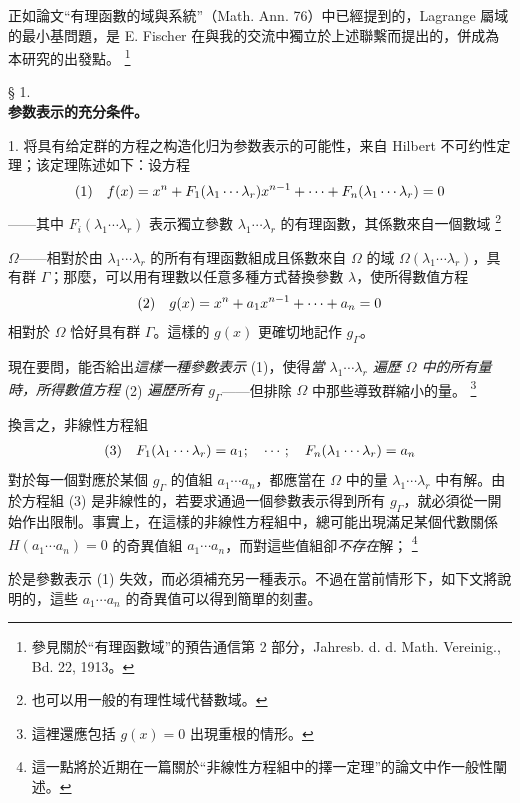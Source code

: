\documentclass[11pt]{article}
\providecommand{\glqq}{“}
\providecommand{\grqq}{”}
\providecommand{\srcfn}[2]{%
  \begingroup
  \renewcommand{\thefootnote}{#1}%
  \footnote{#2}%
  \addtocounter{footnote}{-1}%
  \endgroup}
\begin{document}
正如論文\glqq{}有理函數的域與系統\grqq{}（Math. Ann. 76）中已經提到的，Lagrange 屬域的最小基問題，是 E. Fischer 在與我的交流中獨立於上述聯繫而提出的，併成為本研究的出發點。\srcfn{**)}{參見關於\glqq{}有理函數域\grqq{}的預告通信第 2 部分，Jahresb. d. d. Math. Vereinig., Bd. 22, 1913。}

\begin{center}
§ 1.\\[0.75em]
\textbf{参数表示的充分条件。}
\end{center}

1. 将具有给定群的方程之构造化归为参数表示的可能性，来自 Hilbert 不可约性定理；该定理陈述如下：设方程
\[
\begin{array}{@{}l@{\quad}l@{}}
(1)& \displaystyle f(x)=x^n+F_1(\lambda_1\cdots\lambda_r)x^{n-1}+\cdots+F_n(\lambda_1\cdots\lambda_r)=0
\end{array}
\]
——其中 $F_i(\lambda_1\cdots\lambda_r)$ 表示獨立參數 $\lambda_1\cdots\lambda_r$ 的有理函數，其係數來自一個數域\srcfn{***)}{也可以用一般的有理性域代替數域。}$\Omega$——相對於由 $\lambda_1\cdots\lambda_r$ 的所有有理函數組成且係數來自 $\Omega$ 的域 $\Omega(\lambda_1\cdots\lambda_r)$，具有群 $\Gamma$；那麼，可以用有理數以任意多種方式替換參數 $\lambda$，使所得數值方程
\[
\begin{array}{@{}l@{\quad}l@{}}
(2)& \displaystyle g(x)=x^n+a_1x^{n-1}+\cdots+a_n=0
\end{array}
\]
相對於 $\Omega$ 恰好具有群 $\Gamma$。這樣的 $g(x)$ 更確切地記作 $g_\Gamma$。

現在要問，能否給出\emph{這樣一種參數表示} (1)，使得\emph{當 $\lambda_1\cdots\lambda_r$ 遍歷 $\Omega$ 中的所有量時，所得數值方程} (2) \emph{遍歷所有 $g_\Gamma$}——但排除 $\Omega$ 中那些導致群縮小的量。\srcfn{*)}{這裡還應包括 $g(x)=0$ 出現重根的情形。}換言之，非線性方程組
\[
\begin{array}{@{}l@{\quad}l@{}}
(3)& \displaystyle F_1(\lambda_1\cdots\lambda_r)=a_1;\quad \cdots;\quad F_n(\lambda_1\cdots\lambda_r)=a_n
\end{array}
\]
對於每一個對應於某個 $g_\Gamma$ 的值組 $a_1\cdots a_n$，都應當在 $\Omega$ 中的量 $\lambda_1\cdots\lambda_r$ 中有解。由於方程組 (3) 是非線性的，若要求通過一個參數表示得到所有 $g_\Gamma$，就必須從一開始作出限制。事實上，在這樣的非線性方程組中，總可能出現滿足某個代數關係 $H(a_1\cdots a_n)=0$ 的奇異值組 $a_1\cdots a_n$，而對這些值組卻\emph{不存在}解；\srcfn{**)}{這一點將於近期在一篇關於\glqq{}非線性方程組中的擇一定理\grqq{}的論文中作一般性闡述。}於是參數表示 (1) 失效，而必須補充另一種表示。不過在當前情形下，如下文將說明的，這些 $a_1\cdots a_n$ 的奇異值可以得到簡單的刻畫。
\end{document}
